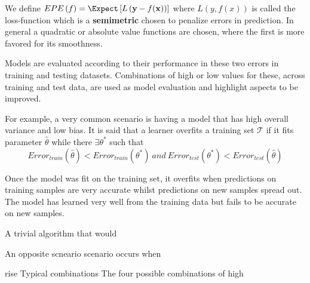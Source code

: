  We define $EPE\left(f \right) = \Expect\left[L\left(\textbf{y} - f(\textbf{x}) \right) \right] $ where $L(y,f\left(x\right))$ is called the loss-function which is a \textbf{semimetric} chosen to penalize errors in prediction. In general a quadratic or absolute value functions are chosen, where the first is more favored for its smoothness. 
 
 
 Models are evaluated according to their performance in these two errors in training and testing datasets. Combinations of high or low values for these, across training and test data, are used as model evaluation and highlight aspects to be improved. 
 
 For example, a very common scenario is having a model that has high overall variance and low bias. 
 It is said that a learner overfits a training set $\mathcal{T}$ if it fits parameter $\hat{\theta}$ while there $\exists \theta^*$ such that
 \begin{equation} \label{eq:overfitting}
 Error_{train}(\hat{\theta}) < Error_{train}(\theta^*) \  and \ Error_{test}(\theta^*) < Error_{test}(\hat{\theta})   
 \end{equation}
 
 Once the model was fit on the training set, it overfits when predictions on training samples are very accurate whilst predictions on new samples spread out. The model has learned very well from the training data but fails to be accurate on new samples.
 
 A trivial algorithm that would 
 
 An opposite scneario scenario occurs when
 
 
 rise Typical combinations
 The four possible combinations of high 
 

